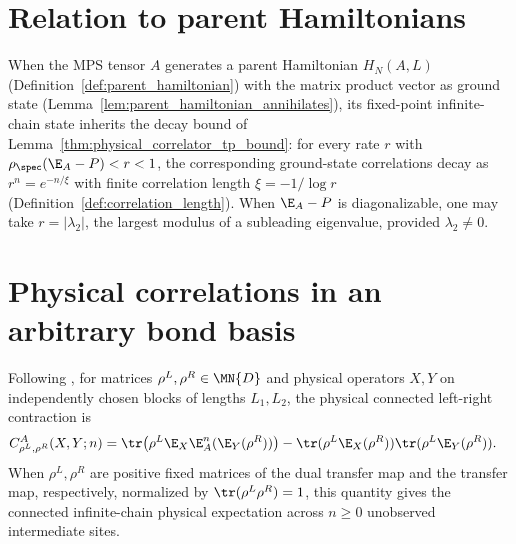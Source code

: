 \section{Relation to parent Hamiltonians}

\begin{remark}\label{rem:correlations_parent_hamiltonian}
    When the MPS tensor $A$ generates a parent Hamiltonian $H_N(A,L)$
    (Definition~\ref{def:parent_hamiltonian}) with the matrix product vector as
    ground state (Lemma~\ref{lem:parent_hamiltonian_annihilates}), its
    fixed-point infinite-chain state inherits the decay bound of
    Lemma~\ref{thm:physical_correlator_tp_bound}: for every rate
    $r$ with $\rho_{\spec}(\E_A-P)<r<1$, the corresponding ground-state
    correlations decay as $r^n=e^{-n/\xi}$ with finite correlation length
    $\xi=-1/\log r$ (Definition~\ref{def:correlation_length}). When $\E_A-P$ is
    diagonalizable, one may take $r=|\lambda_2|$, the largest modulus of a
    subleading eigenvalue, provided $\lambda_2\neq0$.
\end{remark}


\section{Physical correlations in an arbitrary bond basis}

\begin{definition}
    \label{def:physical_left_right_correlator}
    \leanok
    Following \cite[Section~II.B.3]{Cirac2021Matrix}, for matrices
    $\rho^L,\rho^R\in\MN{D}$ and physical operators $X,Y$
    on independently chosen blocks of lengths $L_1,L_2$, the physical connected
    left-right contraction is
    \begin{align}
        C_{\rho^L,\rho^R}^{A}(X,Y;n)
         & =\tr\!\left(\rho^L\E_X\E_A^n(\E_Y(\rho^R))\right)
        -\tr(\rho^L\E_X(\rho^R))\tr(\rho^L\E_Y(\rho^R)).
        \label{eq:correlations_left_right}
    \end{align}
    When $\rho^L,\rho^R$ are positive fixed matrices of the dual transfer
    map and the transfer map, respectively, normalized by
    $\tr(\rho^L\rho^R)=1$, this quantity gives the connected infinite-chain
    physical expectation across $n\geq0$ unobserved intermediate sites.
\end{definition}

